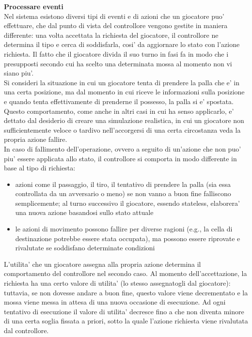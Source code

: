 \textbf{Processare eventi}\\

Nel sistema esistono diversi tipi di eventi e di azioni che un giocatore puo' effettuare, che dal punto di vista del controllore vengono gestite in maniera differente: una volta accettata la richiesta del giocatore, il controllore ne determina il tipo e cerca di soddisfarla, cosi' da aggiornare lo stato con l'azione richiesta. Il fatto che il giocatore divida il suo turno in fasi fa in modo che i presupposti secondo cui ha scelto una determinata mossa al momento non vi siano piu'.\\

Si consideri la situazione in cui un giocatore tenta di prendere la palla che e' in una certa posizione, ma dal momento in cui riceve le informazioni sulla posizione e quando tenta effettivamente di prenderne il possesso, la palla si e' spostata. Questo comportamento, come anche in altri casi in cui ha senso applicarlo, e' dettato dal desiderio di creare una simulazione realistica, in cui un giocatore non sufficientemente veloce o tardivo nell'accorgersi di una certa circostanza veda la propria azione fallire.\\

In caso di fallimento dell'operazione, ovvero a seguito di un'azione che non puo' piu' essere applicata allo stato, il controllore si comporta in modo differente in base al tipo di richiesta:

\begin{itemize}
	\item azioni come il passaggio, il tiro, il tentativo di prendere la palla (sia essa controllata da un avversario o meno) se non vanno a buon fine falliscono semplicemente; al turno successivo il giocatore, essendo stateless, elaborera' una nuova azione basandosi sullo stato attuale
	\item le azioni di movimento possono fallire per diverse ragioni (e.g., la cella di destinazione potrebbe essere stata occupata), ma possono essere riprovate e rivalutate se soddisfano determinate condizioni
\end{itemize}

L'utilita' che un giocatore assegna alla propria azione determina il comportamento del controllore nel secondo caso. Al momento dell'accettazione, la richiesta ha una certo valore di utilita' (lo stesso assegnatogli dal giocatore): tuttavia, se non dovesse andare a buon fine, questo valore viene decrementato e la mossa viene messa in attesa di una nuova occasione di esecuzione. Ad ogni tentativo di esecuzione il valore di utilita' decresce fino a che non diventa minore di una certa soglia fissata a priori, sotto la quale l'azione richiesta viene rivalutata dal controllore.\\

